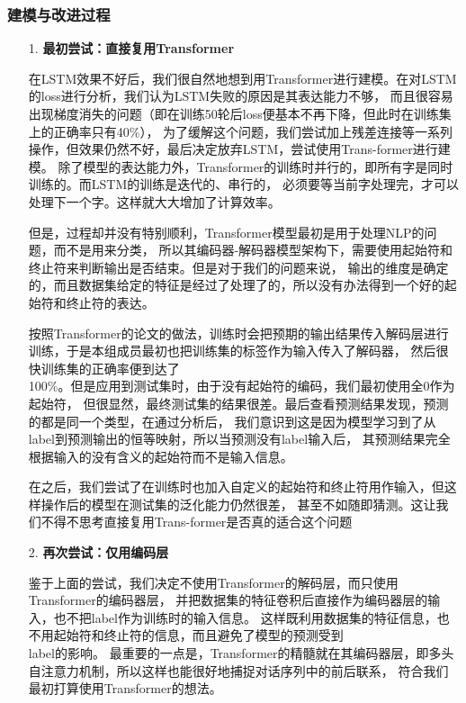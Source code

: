 \documentclass[11pt]{article}
\begin{document}
            \subsubsection{建模与改进过程}
            \begin{enumerate}
                \setlength{\parindent}{2em}
                \item [1. ]\textbf{最初尝试：直接复用Transformer}\par
                在LSTM效果不好后，我们很自然地想到用Transformer进行建模。在对LSTM的loss进行分析，我们认为LSTM失败的原因是其表达能力不够，
                而且很容易出现梯度消失的问题（即在训练50轮后loss便基本不再下降，但此时在训练集上的正确率只有40\%），
                为了缓解这个问题，我们尝试加上残差连接等一系列操作，但效果仍然不好，最后决定放弃LSTM，尝试使用Trans-former进行建模。
                除了模型的表达能力外，Transformer的训练时并行的，即所有字是同时训练的。而LSTM的训练是迭代的、串行的，
                必须要等当前字处理完，才可以处理下一个字。这样就大大增加了计算效率。
                
                但是，过程却并没有特别顺利，Transformer模型最初是用于处理NLP的问题，而不是用来分类，
                所以其编码器-解码器模型架构下，需要使用起始符和终止符来判断输出是否结束。但是对于我们的问题来说，
                输出的维度是确定的，而且数据集给定的特征是经过了处理了的，所以没有办法得到一个好的起始符和终止符的表达。
                
                按照Transformer的论文的做法，训练时会把预期的输出结果传入解码层进行训练，于是本组成员最初也把训练集的标签作为输入传入了解码器，
                然后很快训练集的正确率便到达了\\100\%。但是应用到测试集时，由于没有起始符的编码，我们最初使用全0作为起始符，
                但很显然，最终测试集的结果很差。最后查看预测结果发现，预测的都是同一个类型，在通过分析后，
                我们意识到这是因为模型学习到了从label到预测输出的恒等映射，所以当预测没有label输入后，
                其预测结果完全根据输入的没有含义的起始符而不是输入信息。

                在之后，我们尝试了在训练时也加入自定义的起始符和终止符用作输入，但这样操作后的模型在测试集的泛化能力仍然很差，
                甚至不如随即猜测。这让我们不得不思考直接复用Trans-former是否真的适合这个问题


                \item [2. ]\textbf{再次尝试：仅用编码层}\par
                鉴于上面的尝试，我们决定不使用Transformer的解码层，而只使用Transformer的编码器层，
                并把数据集的特征卷积后直接作为编码器层的输入，也不把label作为训练时的输入信息。
                这样既利用数据集的特征信息，也不用起始符和终止符的信息，而且避免了模型的预测受到\\label的影响。
                最重要的一点是，Transformer的精髓就在其编码器层，即多头自注意力机制，所以这样也能很好地捕捉对话序列中的前后联系，
                符合我们最初打算使用Transformer的想法。
                

\end{enumerate}
\end{document}
